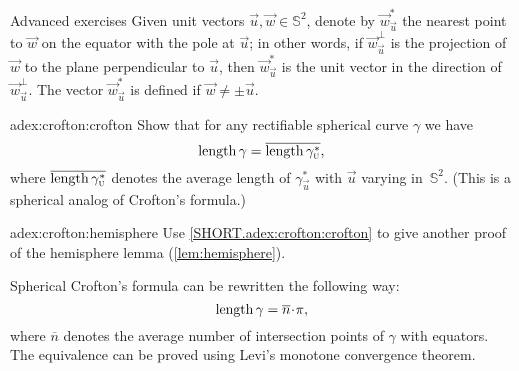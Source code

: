 \begin{thm}{Advanced exercises} \label{adex:crofton}
Given unit vectors ${\vec u},{\vec w}\in\mathbb{S}^2$, denote by ${\vec w}^*_{\vec u}$ the nearest point to ${\vec w}$ on the equator with the pole at ${\vec u}$;
in other words, if ${\vec w}^\perp_{\vec u}$ is the projection of ${\vec w}$ to the plane perpendicular to ${\vec u}$, then ${\vec w}^*_{\vec u}$ is the unit vector in the direction of ${\vec w}^\perp_{\vec u}$.
The vector ${\vec w}^*_{\vec u}$ is defined if ${\vec w}\ne\pm {\vec u}$.

\begin{subthm}{adex:crofton:crofton}
Show that for any rectifiable 
spherical curve $\gamma$ we have
\[\mathop{\rm length}\nolimits\gamma=\overline{\mathop{\rm length}\nolimits\gamma^*_{\text{\sc{u}}}},\]
where $\overline{\mathop{\rm length}\nolimits\gamma^*_{\text{\sc{u}}}}$ denotes the average length of $\gamma^*_{\vec u}$ with ${\vec u}$ varying in~$\mathbb{S}^2$.
(This is a spherical analog of Crofton's formula.)
\end{subthm}

\begin{subthm}{adex:crofton:hemisphere}
Use \ref{SHORT.adex:crofton:crofton} to give another proof of the hemisphere lemma (\ref{lem:hemisphere}). 
\end{subthm}
 
\end{thm}

Spherical Crofton's formula can be rewritten the following way:
\[\length\gamma=\overline n\cdot \pi,\]
where $\overline n$ denotes the average number of intersection points of $\gamma$ with equators.
The equivalence can be proved using Levi's monotone convergence theorem.

